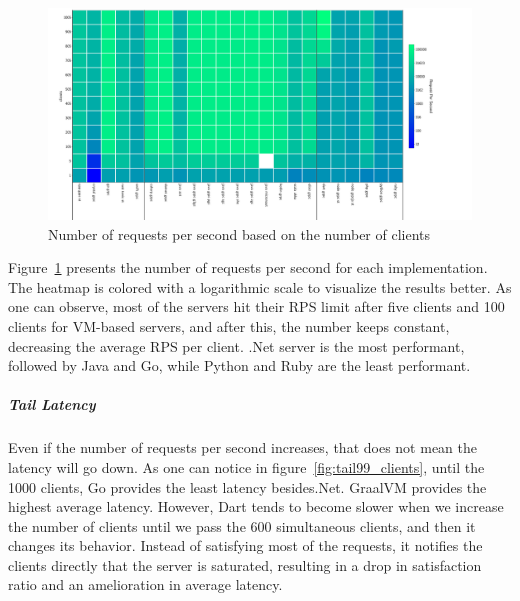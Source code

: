 \begin{figure}[!hbt]
    \begin{center}
        \includegraphics[width=1.2\linewidth]{imgs/rps_clients}
    \end{center}
    \caption{Number of requests per second based on the number of clients}\label{fig:rps_clients}
\end{figure}

Figure~\ref{fig:rps_clients} presents the number of requests per second for each implementation. The heatmap is colored with a logarithmic scale to visualize the results better.
As one can observe, most of the servers hit their RPS limit after five clients and 100 clients for VM-based servers, and after this, the number keeps constant, decreasing the average RPS per client.
.Net server is the most performant, followed by Java and Go, while Python and Ruby are the least performant.

\subparagraph{Tail Latency}
Even if the number of requests per second increases, that does not mean the latency will go down.
As one can notice in figure~\ref{fig:tail99_clients}, until the 1000 clients, Go provides the least latency besides.Net.
GraalVM provides the highest average latency.
However, Dart tends to become slower when we increase the number of clients until we pass the 600 simultaneous clients, and then it changes its behavior. Instead of satisfying most of the requests, it notifies the clients directly that the server is saturated, resulting in a drop in satisfaction ratio and an amelioration in average latency.

